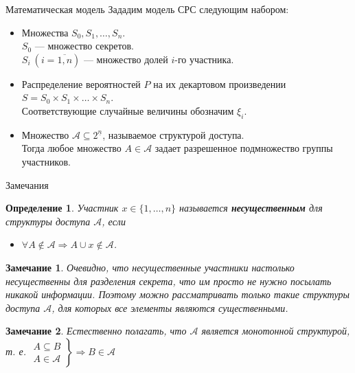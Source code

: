 \documentclass{beamer}
\newtheorem{define}{Определение}
\newtheorem{Note}{Замечание}
\begin{document}
\begin{frame}{Математическая модель}
    Зададим модель СРС следующим набором:
    \begin{itemize}
        \item Множества \( S_0, S_1, \dots, S_n \). \\
        \(S_0\) --- множество секретов. \\ 
        \(S_i \ (i = \overline{1, n})\) --- множество долей \(i\)-го участника.
        \item Распределение вероятностей \(P\) на их декартовом произведении \(S = S_0 \times S_1 \times \dots \times S_n\).\\
        Соответствующие случайные величины обозначим \(\xi_i\).
        \item Множество \(\mathcal{A} \subseteq 2^{\underline{n}}\), называемое структурой доступа. \\Тогда любое множество \(A \in \mathcal{A}\) задает разрешенное подмножество группы участников.
    \end{itemize} 
\end{frame}

\begin{frame}{Замечания}
    \begin{define}
        Участник \(x \in \{1, \dots, n\}\) называется \textbf{несущественным} для структуры доступа \(\mathcal{A}\), если 
        \begin{itemize}
            \item \(\forall A \not\in \mathcal{A} \Longrightarrow A \cup x \not\in \mathcal{A}\).
        \end{itemize}
    \end{define}
    \begin{Note}
        Очевидно, что несущественные участники настолько несущественны для разделения секрета, что им просто не нужно посылать никакой информации. Поэтому можно рассматривать только такие структуры доступа \(\mathcal{A}\), для которых все элементы являются существенными.
    \end{Note}
    \begin{Note}
        Естественно полагать, что \(\mathcal{A}\) является монотонной структурой, т. е. \( \left.
        \begin{array}{c}
            A \subseteq B \\
            A \in \mathcal{A}
            \end{array} \right\} \Longrightarrow B \in \mathcal{A}\)
    \end{Note}
\end{frame}
\end{document}
